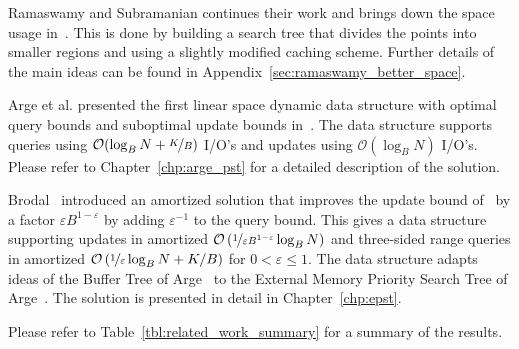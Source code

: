 \documentclass[twoside,11pt,openright]{report}
\def \epsilon {\varepsilon}
\begin{document}
Ramaswamy and Subramanian continues their work and brings down the space usage in~\cite{Subramanian:1995:PTN:313651.313769}. This is done by building a search tree that divides the points into smaller regions and using a slightly modified caching scheme. Further details of the main ideas can be found in Appendix~\ref{sec:ramaswamy_better_space}.

Arge et al. presented the first linear space dynamic data structure with optimal query bounds and suboptimal update bounds in~\cite{arge_samoladas_vitter_1999}. The data structure supports queries using $\mathcal{O}(\log_B N + \nicefrac{K}{B})$ I/O's and updates using $\mathcal{O}(\log_B N)$ I/O's. Please refer to Chapter~\ref{chp:arge_pst} for a detailed description of the solution.

Brodal~\cite{DBLP:journals/corr/Brodal15} introduced an amortized solution that improves the update bound of~\cite{arge_samoladas_vitter_1999} by a factor $\epsilon B^{1-\epsilon}$ by adding $\epsilon^{-1}$ to the query bound. This gives a data structure supporting updates in amortized $\mathcal{O}\left(\nicefrac{1}{\epsilon B^{1-\epsilon}} \log_B N\right)$ and three-sided range queries in amortized $\mathcal{O}\left(\nicefrac{1}{\epsilon}\log_B N + K/B\right)$ for $0 < \epsilon \leq 1$. The data structure adapts ideas of the Buffer Tree of Arge~\cite{Arge:1995:BTN:645930.672850} to the External Memory Priority Search Tree of Arge~\cite{arge_samoladas_vitter_1999}. The solution is presented in detail in Chapter~\ref{chp:epst}.

Please refer to Table~\ref{tbl:related_work_summary} for a summary of the results.
\end{document}
